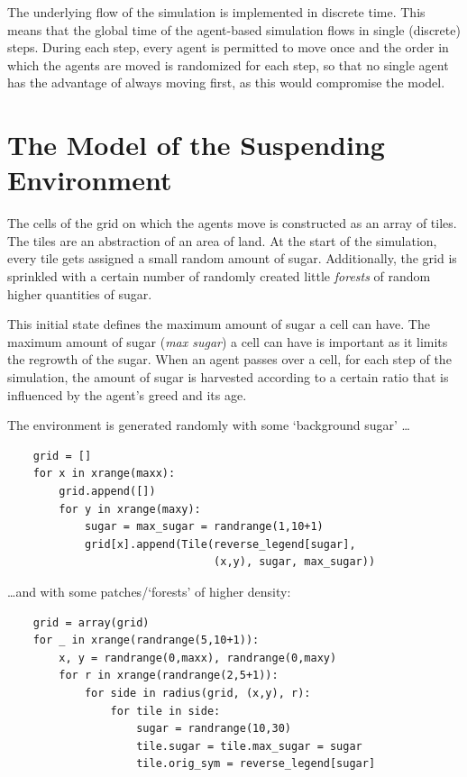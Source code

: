 The underlying flow of the simulation is implemented in discrete time. This means that the global time of the agent-based simulation flows in single (discrete) steps. During each step, every agent is permitted to move once and the order in which the agents are moved is randomized for each step, so that no single agent has the advantage of always moving first, as this would compromise the model.

\section{The Model of the Suspending Environment}

The cells of the grid on which the agents move is constructed as an array of tiles. The tiles are an abstraction of an area of land. At the start of the simulation, every tile gets assigned a small random amount of sugar. Additionally, the grid is sprinkled with a certain number of randomly created little \textit{forests} of random higher quantities of sugar.

This initial state defines the maximum amount of sugar a cell can have. The maximum amount of sugar (\textit{max sugar}) a cell can have is important as it limits the regrowth of the sugar. When an agent passes over a cell, for each step of the simulation, the amount of sugar is harvested according to a certain ratio that is influenced by the agent's greed and its age.

\noindent
The environment is generated randomly with some `background sugar' \dots
\begin{verbatim}
    grid = []
    for x in xrange(maxx):
        grid.append([])
        for y in xrange(maxy):
            sugar = max_sugar = randrange(1,10+1)
            grid[x].append(Tile(reverse_legend[sugar], 
                                (x,y), sugar, max_sugar))
\end{verbatim}
\dots and with some patches/`forests' of higher density:
\begin{verbatim}
    grid = array(grid)
    for _ in xrange(randrange(5,10+1)):
        x, y = randrange(0,maxx), randrange(0,maxy)
        for r in xrange(randrange(2,5+1)):
            for side in radius(grid, (x,y), r):
                for tile in side:
                    sugar = randrange(10,30)
                    tile.sugar = tile.max_sugar = sugar
                    tile.orig_sym = reverse_legend[sugar]
\end{verbatim}


